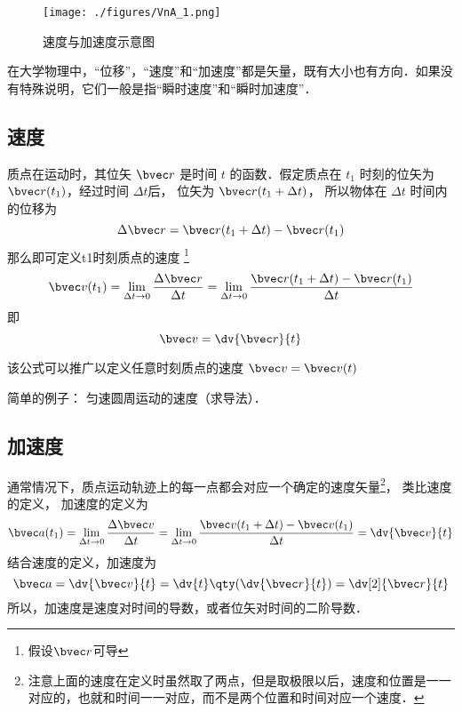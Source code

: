 

\begin{figure}[ht]
\centering
\texttt{[image: ./figures/VnA\_1.png]}
\caption{速度与加速度示意图} \label{VnA_fig1}
\end{figure}

在大学物理中，“位移”，“速度”和“加速度”都是矢量，既有大小也有方向．如果没有特殊说明，它们一般是指“瞬时速度”和“瞬时加速度”．

\subsection{速度}

质点在运动时，其位矢 $\bvec r$ 是时间 $t$ 的函数．假定质点在 $t_1$ 时刻的位矢为 $\bvec r(t_1)$，经过时间 $\Delta t$后， 位矢为 $\bvec r(t_1 + \Delta t)$， 所以物体在 $\Delta t$ 时间内的位移为
\begin{equation}
\Delta \bvec r = \bvec r (t_1 + \Delta t) - \bvec r (t_1)
\end{equation}
那么即可定义t1时刻质点的速度
\footnote{假设$\bvec r$可导}
\begin{equation}
\bvec v(t_1) = \lim_{\Delta t \to 0} \frac{\Delta \bvec r}{\Delta t} = \lim_{\Delta t \to 0} \frac{\bvec r (t_1 + \Delta t) - \bvec r(t_1)}{\Delta t}
\end{equation}
即
\begin{equation}
\bvec v = \dv{\bvec r}{t}
\end{equation}

该公式可以推广以定义任意时刻质点的速度 $\bvec v = \bvec v(t)$

简单的例子： 匀速圆周运动的速度（求导法）．

\subsection{加速度}

通常情况下，质点运动轨迹上的每一点都会对应一个确定的速度矢量\footnote{注意上面的速度在定义时虽然取了两点，但是取极限以后，速度和位置是一一对应的，也就和时间一一对应，而不是两个位置和时间对应一个速度．}， 类比速度的定义， 加速度的定义为
\begin{equation}
\bvec a(t_1) = \lim_{\Delta t \to 0} \frac{\Delta \bvec v}{\Delta t}
= \lim_{\Delta t \to 0} \frac{\bvec v(t_1 + \Delta t) - \bvec v (t_1)}{\Delta t} = \dv{\bvec v}{t}
\end{equation}
结合速度的定义，加速度为
\begin{equation}
\bvec a = \dv{\bvec v}{t} = \dv{t} \qty( \dv{\bvec r}{t} ) = \dv[2]{\bvec r}{t}
\end{equation}
所以，加速度是速度对时间的导数，或者位矢对时间的二阶导数．

